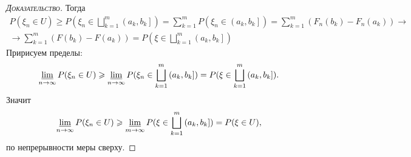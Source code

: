 \documentclass[../main.tex]{subfiles}
\begin{document}
\begin{proof}[\normalfont\textsc{Доказательство}]
 Тогда
 \begin{align*}
  P(\xi_n \in U) \geqslant P(\xi_n \in \bigsqcup_{k=1}^{m} \left(a_k, b_k\right]  ) = \sum_{k=1}^{m}P(\xi_n \in \left(a_k, b_k\right]  ) = \sum_{k=1}^{m}(F_n(b_k) - F_n(a_k)) \to \\
  \to \sum_{k=1}^{m}(F(b_k)-F(a_k)) = P(\xi \in \bigsqcup_{k=1}^{m}\left(a_k, b_k\right]  )
 \end{align*} Пририсуем пределы:
 \begin{align*}
  \varliminf_{n \to \infty} P(\xi_n \in U) \geqslant \varliminf_{n \to \infty} P(\xi_n \in \bigsqcup_{k=1}^{m}\left(a_k, b_k\right]  ) = P(\xi \in \bigsqcup_{k=1}^{m}\left(a_k, b_k\right]  ).
 \end{align*} Значит
 \begin{align*}
  \varliminf_{n \to \infty} P(\xi_n \in U) \geqslant \varliminf_{m \to \infty} P(\xi \in \bigsqcup_{k=1}^{m} \left(a_k, b_k\right]  ) = P(\xi \in U),
 \end{align*} по непрерывности меры сверху.


\end{proof}
\end{document}
